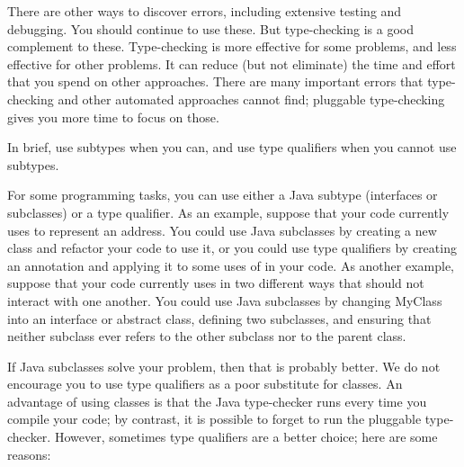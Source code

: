 There are other ways to discover errors, including extensive testing and
debugging.  You should continue to use these.
But type-checking is a good complement to these.  Type-checking is more
effective for some problems, and less effective for other problems.  It can
reduce (but not eliminate) the time and effort that you spend on other
approaches.  There are many important errors that type-checking and other
automated approaches cannot find; pluggable type-checking gives you more
time to focus on those.



\label{when-to-use-type-qualifiers}
\label{faq-qualifiers-vs-subclasses}

In brief, use subtypes when you can, and use type qualifiers when you cannot
use subtypes.

For some programming tasks, you can use either a Java subtype (interfaces
or subclasses) or a type
qualifier.  As an example, suppose that your code currently uses  to
represent an address.  You could use Java subclasses by creating a new
 class and refactor your code to use it, or you could use
type qualifiers by creating an  annotation and applying it
to some uses of  in your code.  As another example, suppose
that your code currently uses  in two different ways that
should not interact with one another.  You could use Java subclasses by
changing MyClass into an interface or abstract class, defining two
subclasses, and ensuring that neither subclass ever refers to the other
subclass nor to the parent class.

If Java subclasses solve your problem, then that is probably better.
We do not encourage you to use type qualifiers as a poor substitute for
classes.  An advantage of using classes is that the Java type-checker
runs every time you compile your code;
by contrast, it is possible to forget to run the pluggable
type-checker.  However, sometimes type qualifiers are a
better choice; here are some reasons:

